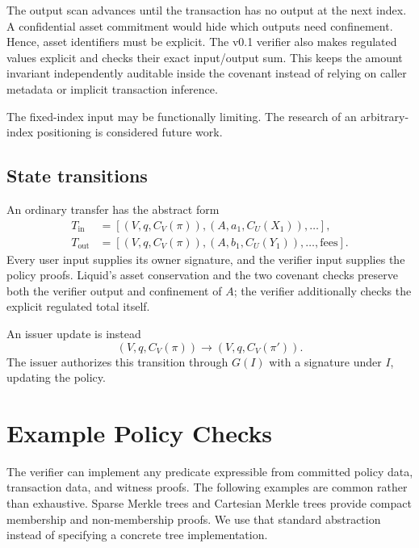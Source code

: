 \documentclass[11pt]{article}
\begin{document}
    The output scan advances until the transaction has no output at the next index.
    A confidential asset commitment would hide which outputs need confinement. Hence, asset identifiers must be explicit.
    The v0.1 verifier also makes regulated values explicit and checks their exact input/output sum. This keeps the amount invariant independently auditable inside the covenant instead of relying on caller metadata or implicit transaction inference.

    The fixed-index input may be functionally limiting.
    The research of an arbitrary-index positioning is considered future work.

    \subsection{State transitions}

    An ordinary transfer has the abstract form
    \begin{align}
        T_{\mathrm{in}} &=[(V,q,C_V(\pi)),(A,a_1,C_U(X_1)),\ldots], \\
        T_{\mathrm{out}}&=[(V,q,C_V(\pi)),(A,b_1,C_U(Y_1)),\ldots,\mathrm{fees}].
    \end{align}
    Every user input supplies its owner signature, and the verifier input supplies the policy proofs.
    Liquid's asset conservation and the two covenant checks preserve both the verifier output and confinement of $A$; the verifier additionally checks the explicit regulated total itself.

    An issuer update is instead
    \begin{equation}
        (V,q,C_V(\pi))\longrightarrow(V,q,C_V(\pi')).
    \end{equation}
    The issuer authorizes this transition through $G(I)$ with a signature under $I$, updating the policy.


    \section{Example Policy Checks}
    \label{sec:policies}

    The verifier can implement any predicate expressible from committed policy data, transaction data, and witness proofs.
    The following examples are common rather than exhaustive.
    Sparse Merkle trees \cite{compact-smt} and Cartesian Merkle trees \cite{cmt} provide compact membership and non-membership proofs.
    We use that standard abstraction instead of specifying a concrete tree implementation.
\end{document}
